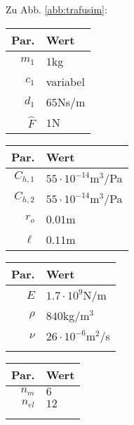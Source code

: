 Zu Abb. \ref{abb:trafusim}:
\begin{center}
\begin{tabular}{r|l}
Par. &Wert\\\hline
$m_1$&$1$kg\\
$c_{1}$& variabel\\
$d_{1}$&$65$Ns/m \\
$\hat{F}$&$1$N\\
\end{tabular}\hfill
\begin{tabular}{r|l}
Par. &Wert\\\hline
$C_{h,1}$&$55\cdot10^{-14}$m$^3$/Pa\\
$C_{h,2}$&$55\cdot10^{-14}$m$^3$/Pa\\
$r_o$&$0.01$m\\
$\ell$&$0.11$m\\
\end{tabular}\hfill
\begin{tabular}{r|l}
Par. &Wert\\\hline
$E$&$1.7\cdot10^{9}$N/m\\
$\rho$&$840$kg/m$^3$\\
$\nu$&$26\cdot10^{-6}$m$^2$/s\\
&
\end{tabular}\hfill
\begin{tabular}{r|l}
Par. &Wert\\\hline
$n_m$& $6$ \\
$n_{el}$& $12$ \\
&\\
&
\end{tabular} 
\end{center}


